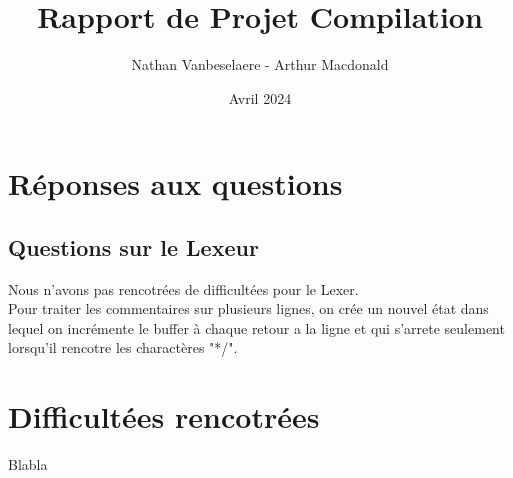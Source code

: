\documentclass{report}
\title{\textbf{\Huge Rapport de Projet Compilation }}
\author{Nathan Vanbeselaere - Arthur Macdonald}
\date{Avril 2024}
\begin{document}
\maketitle
\newpage

\tableofcontents
\newpage

\chapter*{Réponses aux questions}
    \section*{Questions sur le Lexeur}

        Nous n'avons pas rencotrées de difficultées pour le Lexer.\\
        Pour traiter les commentaires sur plusieurs lignes, on crée un nouvel état dans lequel on incrémente le buffer à chaque retour a la ligne et qui s'arrete seulement lorsqu'il rencotre les charactères "*/". 



\chapter*{Difficultées rencotrées}
    Blabla
\end{document}
